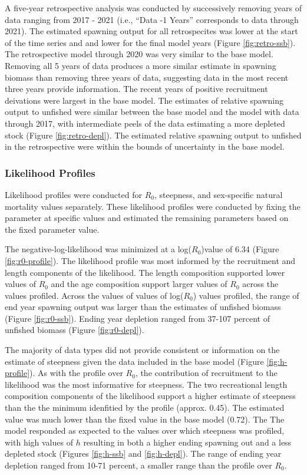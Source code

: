 \documentclass[11pt,
  english,
  letterpaper,
]{article}
\begin{document}
A five-year retrospective analysis was conducted by successively removing years of data ranging from 2017 - 2021 (i.e., ``Data -1 Years'' corresponds to data through 2021). The estimated spawning output for all retrospecites was lower at the start of the time series and and lower for the final model years (Figure \ref{fig:retro-ssb}). The retrospective model through 2020 was very similar to the base model. Removing all 5 years of data produces a more similar estimate in spawning biomass than removing three years of data, suggesting data in the most recent three years provide information. The recent years of positive recruitment deivations were largest in the base model. The estimates of relative spawning output to unfished were similar between the base model and the model with data through 2017, with intermediate peels of the data estimating a more depleted stock (Figure \ref{fig:retro-depl}). The estimated relative spawning output to unfished in the retrospective were within the bounds of uncertainty in the base model.

\hypertarget{likelihood-profiles}{%
\subsubsection{Likelihood Profiles}\label{likelihood-profiles}}

Likelihood profiles were conducted for \(R_0\), steepness, and sex-specific natural mortality values separately. These likelihood profiles were conducted by fixing the parameter at specific values and estimated the remaining parameters based on the fixed parameter value.

The negative-log-likelihood was minimized at a log(\(R_0\))value of 6.34 (Figure \ref{fig:r0-profile}). The likelihood profile was most informed by the recruitment and length components of the likelihood. The length composition supported lower values of \(R_0\) and the age composition support larger values of \(R_0\) across the values profiled. Across the values of values of log(\(R_0\)) values profiled, the range of end year spawning output was larger than the estimates of unfished biomass (Figure \ref{fig:r0-ssb}). Ending year depletion ranged from 37-107 percent of unfished biomass (Figure \ref{fig:r0-depl}).

The majority of data types did not provide consistent or information on the estimate of steepness given the data included in the base model (Figure \ref{fig:h-profile}). As with the profile over \(R_0\), the contribution of recruitment to the likelihood was the most informative for steepness. The two recreational length composition components of the likelihood support a higher estimate of steepness than the the minimum idenfitied by the profile (approx. 0.45). The estimated value was much lower than the fixed value in the base model (0.72). The The model responded as expected to the values over which steepness was profiled, with high values of \(h\) resulting in both a higher ending spawning out and a less depleted stock (Figures \ref{fig:h-ssb} and \ref{fig:h-depl}). The range of ending year depletion ranged from 10-71 percent, a smaller range than the profile over \(R_0\).
\end{document}
